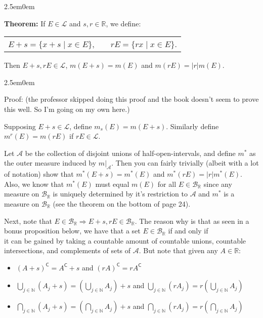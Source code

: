 \documentclass{book}
\newcommand{\hTwo}{%
\color{MidnightBlue}%
   \fontsize{13}{15}\selectfont%
}
\newcommand{\hThree}{%
   \color{PineGreen!85!Orange}
   \fontsize{12}{14}\selectfont%
}
\newcommand{\myComment}{%
   \color{RawerSienna}%
   \fontsize{12}{14}\selectfont%
}
\newenvironment{myIndent}{%
   \begin{adjustwidth}{2.5em}{0em}%
}{%
   \end{adjustwidth}%
}
\newcommand{\blab}[1]{\textbf{#1}}
\newcommand{\comp}{\mathsf{C}}
\newcommand{\retTwo}{\hfill\bigbreak}
\begin{document}
\begin{myIndent}\hTwo
   \blab{Theorem:} If $E \in \mathcal{L}$ and $s, r \in \mathbb{R}$, we define:

   {\centering 
   \begin{tabular}{l c l}
      $E + s = \{x + s \mid x \in E\}$, & \phantom{a} & $rE = \{rx \mid x \in E\}$.
   \end{tabular} \retTwo\par}

   Then $E + s, rE \in \mathcal{L}$, $m(E + s) = m(E)$ and $m(rE) = |r|m(E)$.

   
   \begin{myIndent}\hThree
      Proof: {\myComment(the professor skipped doing this proof and the book doesn't seem to prove this well. So I'm going on my own here.)}\retTwo

      Supposing $E + s \in \mathcal{L}$, define $m_s(E) = m(E + s)$. Similarly define $m^r(E) = m(rE)$ if $rE \in \mathcal{L}$.\retTwo

      Let $\mathcal{A}$ be the collection of disjoint unions of half-open-intervals, and define $m^*$ as the outer measure induced by $m|_{\mathcal{A}}$. Then you can fairly trivially (albeit with a lot of notation) show that $m^*(E + s) = m^*(E)$ and $m^*(rE) = |r|m^*(E)$. Also, we know that $m^*(E)$ must equal $m(E)$ for all $E \in \mathcal{B}_{\mathbb{R}}$ since any measure on $\mathcal{B}_{\mathbb{R}}$ is uniquely determined by it's restriction to $\mathcal{A}$ and $m^*$ is a measure on $\mathcal{B}_{\mathbb{R}}$ (see the theorem on the bottom of page 24).\newpage

      Next, note that $E \in \mathcal{B}_\mathbb{R} \Longrightarrow E + s, rE \in \mathcal{B}_\mathbb{R}$. The reason why is that as seen in a bonus proposition below, we have that a set $E \in \mathcal{B}_\mathbb{R}$ if and only if\\ it can be gained by taking a countable amount of countable unions, countable\\ intersections, and complements of sets of $\mathcal{A}$. But note that given any $A \in \mathbb{R}$:
      \begin{itemize}
         \item $(A + s)^\comp = A^\comp + s$ and $(rA)^\comp = rA^\comp$
         \item $\bigcup\limits_{j \in \mathbb{N}}(A_j + s) = (\bigcup\limits_{j \in \mathbb{N}}A_j) + s$ and $\bigcup\limits_{j \in \mathbb{N}}(rA_j) = r(\bigcup\limits_{j \in \mathbb{N}}A_j)$
         \item $\bigcap\limits_{j \in \mathbb{N}}(A_j + s) = (\bigcap\limits_{j \in \mathbb{N}}A_j) + s$ and $\bigcap\limits_{j \in \mathbb{N}}(rA_j) = r(\bigcap\limits_{j \in \mathbb{N}}A_j)$\retTwo
      \end{itemize}


\end{myIndent}
\end{myIndent}
\end{document}
